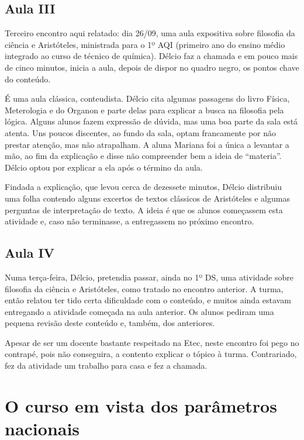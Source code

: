 \documentclass[12pt,a4paper]{article}
\begin{document}
    \subsection*{Aula III}
    
    Terceiro encontro aqui relatado: dia 26/09, uma aula expositiva sobre 
    filosofia da ciência e Aristóteles, ministrada para o 1º AQI (primeiro ano
    do ensino médio integrado ao curso de técnico de química). Délcio faz a 
    chamada e em pouco mais de cinco minutos, inicia a aula, depois de dispor 
    no quadro negro, os pontos chave do conteúdo. 
    
    É uma aula clássica, conteudista. Délcio cita algumas passagens do livro 
    Física, Meterologia e do Organon e parte delas para explicar a busca na 
    filosofia pela lógica. Alguns alunos fazem expressão de dúvida, mas uma boa 
    parte da sala está atenta. Uns poucos discentes, ao fundo da sala, 
    optam francamente por não prestar atenção, mas não atrapalham. A aluna 
    Mariana foi a única a levantar a mão, ao fim da explicação e disse não 
    compreender bem a ideia de ``materia''. Délcio optou por explicar a ela 
    após o término da aula. 
    
    Findada a explicação, que levou cerca de dezessete minutos, Délcio 
    distribuiu uma folha contendo alguns excertos de textos clássicos de 
    Aristóteles e algumas perguntas de interpretação de texto. A ideia é que 
    os alunos começassem esta atividade e, caso não terminasse, a entregassem 
    no próximo encontro. 
    
    \subsection*{Aula IV}

	Numa terça-feira, Délcio, pretendia passar, ainda no 1º DS, uma atividade 
	sobre filosofia da ciência e Aristóteles, como tratado no encontro 
	anterior. A turma, então relatou ter tido certa dificuldade com o conteúdo, 
	e muitos ainda estavam entregando a atividade começada na aula anterior. 
	Os alunos pediram uma pequena revisão deste conteúdo e, também, dos 
	anteriores.  
	
	Apesar de ser um docente bastante respeitado na Etec, neste encontro foi 
	pego no contrapé, pois não conseguira, a contento explicar o tópico à 
	turma. Contrariado, fez da atividade um trabalho para casa e fez a chamada. 
	
	\newpage
		
	\section{O curso em vista dos parâmetros nacionais}
	
\end{document}
